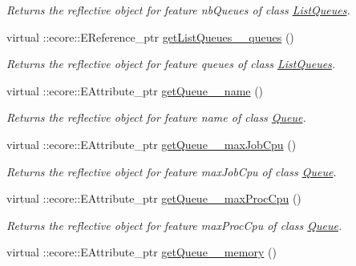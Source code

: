\begin{DoxyCompactItemize}
\begin{DoxyCompactList}\small\item\em Returns the reflective object for feature nbQueues of class \hyperlink{classTMS__Data_1_1ListQueues}{ListQueues}. \item\end{DoxyCompactList}\item 
virtual ::ecore::EReference\_\-ptr \hyperlink{classTMS__Data_1_1TMS__DataPackage_a35b273d0c27df68db852957d06603fa2}{getListQueues\_\-\_\-queues} ()
\begin{DoxyCompactList}\small\item\em Returns the reflective object for feature queues of class \hyperlink{classTMS__Data_1_1ListQueues}{ListQueues}. \item\end{DoxyCompactList}\item 
virtual ::ecore::EAttribute\_\-ptr \hyperlink{classTMS__Data_1_1TMS__DataPackage_a13b9120735700323b8c264ce30ed5676}{getQueue\_\-\_\-name} ()
\begin{DoxyCompactList}\small\item\em Returns the reflective object for feature name of class \hyperlink{classTMS__Data_1_1Queue}{Queue}. \item\end{DoxyCompactList}\item 
virtual ::ecore::EAttribute\_\-ptr \hyperlink{classTMS__Data_1_1TMS__DataPackage_a8ded81eacd238f3ea34ecfe8899a24bf}{getQueue\_\-\_\-maxJobCpu} ()
\begin{DoxyCompactList}\small\item\em Returns the reflective object for feature maxJobCpu of class \hyperlink{classTMS__Data_1_1Queue}{Queue}. \item\end{DoxyCompactList}\item 
virtual ::ecore::EAttribute\_\-ptr \hyperlink{classTMS__Data_1_1TMS__DataPackage_aefb37e10ed037aad84f2d62e4dfb4d0d}{getQueue\_\-\_\-maxProcCpu} ()
\begin{DoxyCompactList}\small\item\em Returns the reflective object for feature maxProcCpu of class \hyperlink{classTMS__Data_1_1Queue}{Queue}. \item\end{DoxyCompactList}\item 
virtual ::ecore::EAttribute\_\-ptr \hyperlink{classTMS__Data_1_1TMS__DataPackage_a5619b41b6b23cc16040cc616a199461a}{getQueue\_\-\_\-memory} ()

\end{DoxyCompactItemize}
